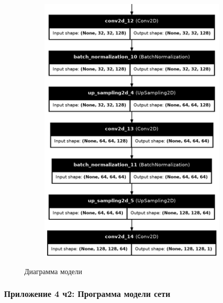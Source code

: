 \documentclass{beamer}
\begin{document}
\begin{frame}
\begin{figure}[!hp]
\begin{subfigure}[t]{0.45\textwidth}
			\includegraphics[width=\textwidth]{model_diagram2}
		\end{subfigure} 
	\vspace{-0.6em}
	\caption{Диаграмма модели}
	\label{model_diagram}
	\end{figure}
\end{frame}

\begin{frame}
	\frametitle{Приложение 4 ч2: Программа модели сети}
	\centering
\end{frame}
\end{document}
